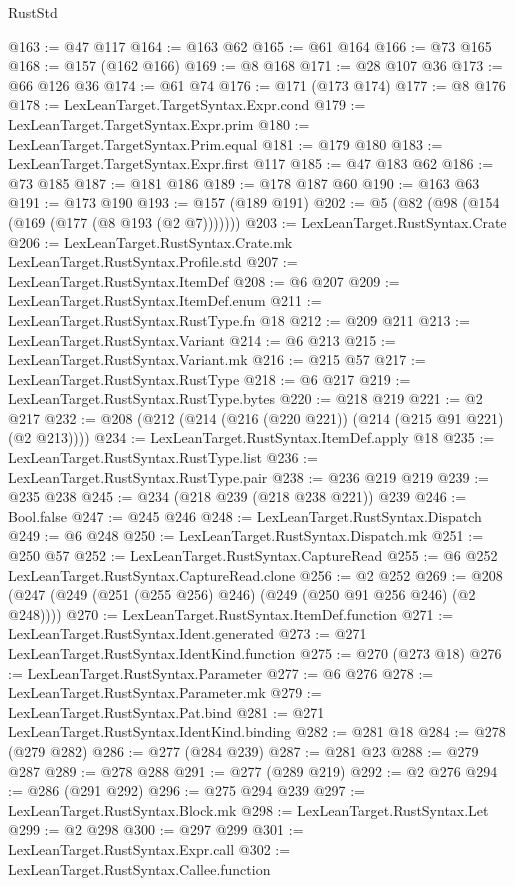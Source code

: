 \begin{lexlean}{RustStd}
\begin{coremodule}
@163 := @47 @117
@164 := @163 @62
@165 := @61 @164
@166 := @73 @165
@168 := @157 (@162 @166)
@169 := @8 @168
@171 := @28 @107 @36
@173 := @66 @126 @36
@174 := @61 @74
@176 := @171 (@173 @174)
@177 := @8 @176
@178 := LexLeanTarget.TargetSyntax.Expr.cond
@179 := LexLeanTarget.TargetSyntax.Expr.prim
@180 := LexLeanTarget.TargetSyntax.Prim.equal
@181 := @179 @180
@183 := LexLeanTarget.TargetSyntax.Expr.first @117
@185 := @47 @183 @62
@186 := @73 @185
@187 := @181 @186
@189 := @178 @187 @60
@190 := @163 @63
@191 := @173 @190
@193 := @157 (@189 @191)
@202 := @5 (@82 (@98 (@154 (@169 (@177 (@8 @193 (@2 @7)))))))
@203 := LexLeanTarget.RustSyntax.Crate
@206 := LexLeanTarget.RustSyntax.Crate.mk LexLeanTarget.RustSyntax.Profile.std
@207 := LexLeanTarget.RustSyntax.ItemDef
@208 := @6 @207
@209 := LexLeanTarget.RustSyntax.ItemDef.enum
@211 := LexLeanTarget.RustSyntax.RustType.fn @18
@212 := @209 @211
@213 := LexLeanTarget.RustSyntax.Variant
@214 := @6 @213
@215 := LexLeanTarget.RustSyntax.Variant.mk
@216 := @215 @57
@217 := LexLeanTarget.RustSyntax.RustType
@218 := @6 @217
@219 := LexLeanTarget.RustSyntax.RustType.bytes
@220 := @218 @219
@221 := @2 @217
@232 := @208 (@212 (@214 (@216 (@220 @221)) (@214 (@215 @91 @221) (@2 @213))))
@234 := LexLeanTarget.RustSyntax.ItemDef.apply @18
@235 := LexLeanTarget.RustSyntax.RustType.list
@236 := LexLeanTarget.RustSyntax.RustType.pair
@238 := @236 @219 @219
@239 := @235 @238
@245 := @234 (@218 @239 (@218 @238 @221)) @239
@246 := Bool.false
@247 := @245 @246
@248 := LexLeanTarget.RustSyntax.Dispatch
@249 := @6 @248
@250 := LexLeanTarget.RustSyntax.Dispatch.mk
@251 := @250 @57
@252 := LexLeanTarget.RustSyntax.CaptureRead
@255 := @6 @252 LexLeanTarget.RustSyntax.CaptureRead.clone
@256 := @2 @252
@269 := @208 (@247 (@249 (@251 (@255 @256) @246) (@249 (@250 @91 @256 @246) (@2 @248))))
@270 := LexLeanTarget.RustSyntax.ItemDef.function
@271 := LexLeanTarget.RustSyntax.Ident.generated
@273 := @271 LexLeanTarget.RustSyntax.IdentKind.function
@275 := @270 (@273 @18)
@276 := LexLeanTarget.RustSyntax.Parameter
@277 := @6 @276
@278 := LexLeanTarget.RustSyntax.Parameter.mk
@279 := LexLeanTarget.RustSyntax.Pat.bind
@281 := @271 LexLeanTarget.RustSyntax.IdentKind.binding
@282 := @281 @18
@284 := @278 (@279 @282)
@286 := @277 (@284 @239)
@287 := @281 @23
@288 := @279 @287
@289 := @278 @288
@291 := @277 (@289 @219)
@292 := @2 @276
@294 := @286 (@291 @292)
@296 := @275 @294 @239
@297 := LexLeanTarget.RustSyntax.Block.mk
@298 := LexLeanTarget.RustSyntax.Let
@299 := @2 @298
@300 := @297 @299
@301 := LexLeanTarget.RustSyntax.Expr.call
@302 := LexLeanTarget.RustSyntax.Callee.function

\end{coremodule}
\end{lexlean}
